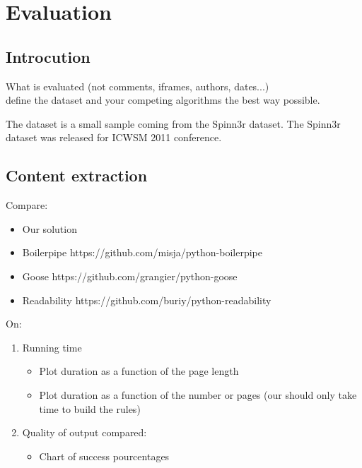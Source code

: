 \section{Evaluation}

\subsection{Introcution}
What is evaluated (not comments, iframes, authors, dates...)
\\ define the dataset and your competing algorithms the best way possible.

The dataset is a small sample coming from the Spinn3r dataset. The Spinn3r dataset was released for ICWSM 2011 conference.

\subsection{Content extraction}
Compare:
\begin{itemize}
  \item Our solution
  \item Boilerpipe https://github.com/misja/python-boilerpipe
  \item Goose https://github.com/grangier/python-goose
  \item Readability https://github.com/buriy/python-readability
\end{itemize}
On:
\begin{enumerate}
  \item Running time
  \begin{itemize}
    \item Plot duration as a function of the page length
    \item Plot duration as a function of the number or pages (our should only take time to build the rules)
  \end{itemize}
  \item Quality of output compared:
  \begin{itemize}
    \item Chart of success pourcentages
  \end{itemize}
\end{enumerate}

